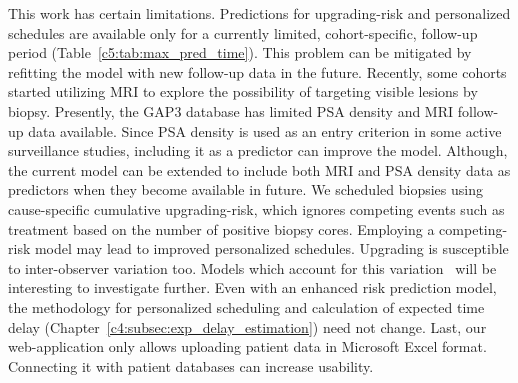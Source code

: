 This work has certain limitations. Predictions for upgrading-risk and personalized schedules are available only for a currently limited, cohort-specific, follow-up period (Table~\ref{c5:tab:max_pred_time}). This problem can be mitigated by refitting the model with new follow-up data in the future. Recently, some cohorts started utilizing MRI to explore the possibility of targeting visible lesions by biopsy. Presently, the GAP3 database has limited PSA density and MRI follow-up data available. Since PSA density is used as an entry criterion in some active surveillance studies, including it as a predictor can improve the model. Although, the current model can be extended to include both MRI and PSA density data as predictors when they become available in future. We scheduled biopsies using cause-specific cumulative upgrading-risk, which ignores competing events such as treatment based on the number of positive biopsy cores. Employing a competing-risk model may lead to improved personalized schedules. Upgrading is susceptible to inter-observer variation too. Models which account for this variation~\citep{coley2017prediction,balasubramanian2003estimation} will be interesting to investigate further. Even with an enhanced risk prediction model, the methodology for personalized scheduling and calculation of expected time delay (Chapter~\ref{c4:subsec:exp_delay_estimation}) need not change. Last, our web-application only allows uploading patient data in Microsoft Excel format. Connecting it with patient databases can increase usability.
